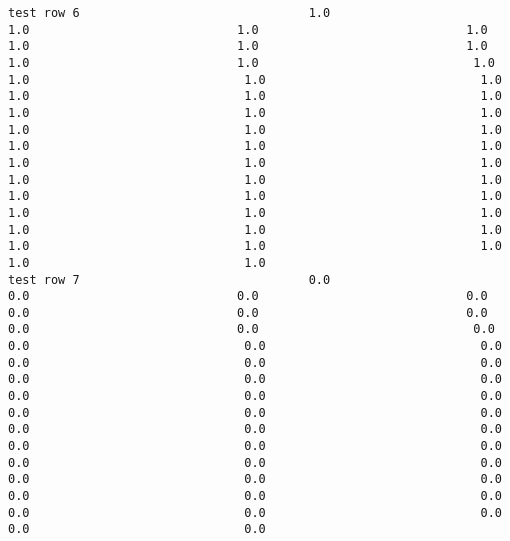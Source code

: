 \documentclass[11pt]{article}
\begin{document}
\begin{verbatim}
test row 6                                1.0                             1.0                             1.0                             1.0                             1.0                             1.0                             1.0                             1.0                             1.0                              1.0                              1.0                              1.0                              1.0                              1.0                              1.0                              1.0                              1.0                              1.0                              1.0                              1.0                              1.0                              1.0                              1.0                              1.0                              1.0                              1.0                              1.0                              1.0                              1.0                              1.0                              1.0                              1.0                              1.0                              1.0                              1.0                              1.0                              1.0                              1.0                              1.0                              1.0                              1.0                              1.0                              1.0                              1.0                              1.0
test row 7                                0.0                             0.0                             0.0                             0.0                             0.0                             0.0                             0.0                             0.0                             0.0                              0.0                              0.0                              0.0                              0.0                              0.0                              0.0                              0.0                              0.0                              0.0                              0.0                              0.0                              0.0                              0.0                              0.0                              0.0                              0.0                              0.0                              0.0                              0.0                              0.0                              0.0                              0.0                              0.0                              0.0                              0.0                              0.0                              0.0                              0.0                              0.0                              0.0                              0.0                              0.0                              0.0                              0.0                              0.0                              0.0

\end{verbatim}
\end{document}
